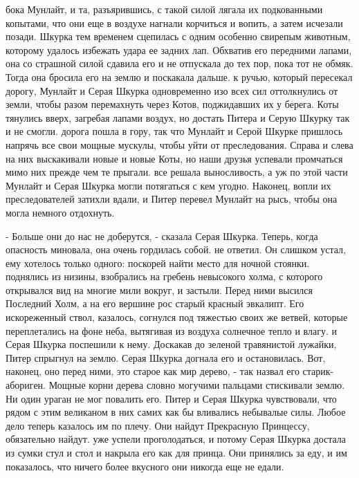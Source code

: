 бока Мунлайт, и та, разъярившись, с такой силой лягала их подкованными 
копытами, что они еще в воздухе нагнали корчиться и вопить, а затем 
исчезали позади.
 Шкурка тем временем сцепилась с одним особенно свирепым 
животным, которому удалось избежать удара ее задних лап. Обхватив его 
передними лапами, она со страшной силой сдавила его и не отпускала до 
тех пор, пока тот не обмяк. Тогда она бросила его на землю и поскакала 
дальше.
 к ручью, который пересекал дорогу, Мунлайт и Серая Шкурка 
одновременно изо всех сил оттолкнулись от земли, чтобы разом 
перемахнуть через Котов, поджидавших их у берега. Коты тянулись вверх, 
загребая лапами воздух, но достать Питера и Серую Шкурку так и не 
смогли.
 дорога пошла в гору, так что Мунлайт и Серой Шкурке 
пришлось напрячь все свои мощные мускулы, чтобы уйти от преследования. 
Справа и слева на них выскакивали новые и новые Коты, но наши друзья 
успевали промчаться мимо них прежде чем те прыгали.
 все решала выносливость, а уж по этой части Мунлайт и Серая 
Шкурка могли потягаться с кем угодно. Наконец, вопли их 
преследователей затихли вдали, и Питер перевел Мунлайт на рысь, чтобы 
она могла немного отдохнуть.
\par- Больше они до нас не доберутся, - сказала Серая Шкурка. Теперь, 
когда опасность миновала, она очень гордилась собой.
 не ответил. Он слишком устал, ему хотелось только одного: 
поскорей найти место для ночной стоянки.
 поднялись из низины, взобрались на гребень невысокого холма, с 
которого открывался вид на многие мили вокруг, и застыли. Перед ними 
высился Последний Холм, а на его вершине рос старый красный эвкалипт. 
Его искореженный ствол, казалось, согнулся под тяжестью своих же 
ветвей, которые переплетались на фоне неба, вытягивая из воздуха 
солнечное тепло и влагу.
 и Серая Шкурка поспешили к нему. Доскакав до зеленой 
травянистой лужайки, Питер спрыгнул на землю. Серая Шкурка догнала его 
и остановилась. Вот, наконец, оно перед ними, это старое как мир 
дерево, - так назвал его старик-абориген. Мощные корни дерева словно 
могучими пальцами стискивали землю. Ни один ураган не мог повалить 
его. Питер и Серая Шкурка чувствовали, что рядом с этим великаном в 
них самих как бы вливались небывалые силы. Любое дело теперь казалось 
им по плечу. Они найдут Прекрасную Принцессу, обязательно найдут.
 уже успели проголодаться, и потому Серая Шкурка достала из 
сумки стул и стол и накрыла его как для принца. Они принялись за еду, 
и им показалось, что ничего более вкусного они никогда еще не едали. 

